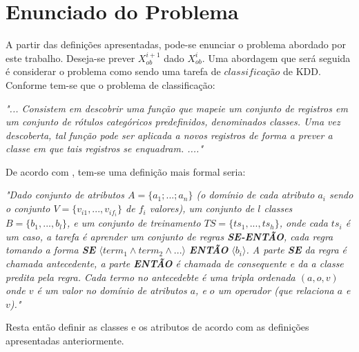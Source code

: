 \section{Enunciado do Problema}

A partir das definições apresentadas, pode-se enunciar o problema 
abordado por este trabalho. Deseja-se prever $X_{ob}^{i+1}$ dado
$X_{ob}^{i}$. Uma abordagem que será seguida é considerar
o problema como sendo uma tarefa de $classificação$ de KDD. Conforme
\cite{passos2005datamining} tem-se que o problema de classificação:

\begin{description}
  \item \textit{"... Consistem em descobrir uma função que mapeie um conjunto de
  registros em um conjunto de rótulos categóricos predefinidos, denominados
  classes. Uma vez descoberta, tal função pode ser aplicada a novos registros
  de forma a prever a classe em que tais registros se enquadram. ...."}
\end{description}

De acordo com \cite{doringo2004ant}, tem-se uma definição mais formal seria:
\begin{description}
  \item \textit{"Dado conjunto de atributos $A = \lbrace a_1 ; . . . ; a_n\rbrace$ 
  (o domínio de cada atributo $a_i$ sendo o conjunto $V = \lbrace v_{i1} , . . ., v_{if_i}\rbrace$ de $f_i$ valores),
  um conjunto de $l$ classes $B = \lbrace b_1 , . . . , b_l \rbrace$, e um conjunto de treinamento 
  $TS = \lbrace ts_1 , . . . , ts_h \rbrace $, onde cada $ts_i$ é um caso,
  a tarefa é aprender um conjunto de regras \textbf{SE-ENTÃO}, cada regra tomando a forma
  \textbf{SE} $\langle term_1 \wedge term_2 \wedge...\rangle $ \textbf{ENTÃO} $\langle b_i \rangle$. 
  A parte \textbf{SE} da regra é chamada antecedente, a parte \textbf{ENTÃO} é chamada de
  consequente e da a classe predita pela regra. Cada termo no antecedebte é uma tripla ordenada
  $(a, o, v)$ onde $v$ é um valor no domínio de atributos $a$, e $o$ um operador (que relaciona $a$ e $v$)."}
\end{description}

Resta então definir as classes e os atributos de acordo com as definições apresentadas anteriormente.